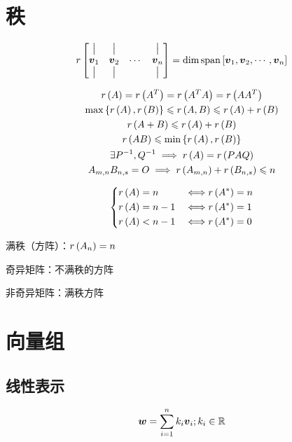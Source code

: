 \documentclass{article}
\begin{document}
\section{秩}

\begin{definition}
    \[r\begin{bmatrix}
            \big| & \big| &        & \big| \\
            \boldsymbol v_1  & \boldsymbol v_2  & \cdots & \boldsymbol v_n  \\
            \big| & \big| &        & \big|
        \end{bmatrix}
        =\dim\mathrm{span}\left[\boldsymbol v_1,\boldsymbol v_2,\cdots,\boldsymbol v_n\right]\]
\end{definition}

\[\begin{gathered}
        r\left(A\right)=r\left(A^T\right)=r\left(A^TA\right)=r\left(AA^T\right)\\
        \max\left\{r\left(A\right),r\left(B\right)\right\}\leqslant r\left(A,B\right)\leqslant r\left(A\right)+r\left(B\right)\\
        r\left(A+B\right)\leqslant r\left(A\right)+r\left(B\right)\\
        r\left(AB\right)\leqslant\min\left\{r\left(A\right),r\left(B\right)\right\}\\
        \exists P^{-1},Q^{-1}\implies r\left(A\right)=r\left(PAQ\right)\\
        A_{m,n}B_{n,s}=O\implies r\left(A_{m,n}\right)+r\left(B_{n,s}\right)\leqslant n
    \end{gathered}\]

\[\left\{\begin{aligned}
        r\left(A\right) & =n   & \iff & r\left(A^*\right)=n \\
        r\left(A\right) & =n-1 & \iff & r\left(A^*\right)=1 \\
        r\left(A\right) & <n-1 & \iff & r\left(A^*\right)=0
    \end{aligned}\right.\]

满秩（方阵）：$r\left(A_n\right)=n$

奇异矩阵：不满秩的方阵

非奇异矩阵：满秩方阵

\section{向量组}

\subsection{线性表示}

\[\boldsymbol w=\sum_{i=1}^nk_i\boldsymbol v_i;k_i\in\mathbb R\]
\end{document}
